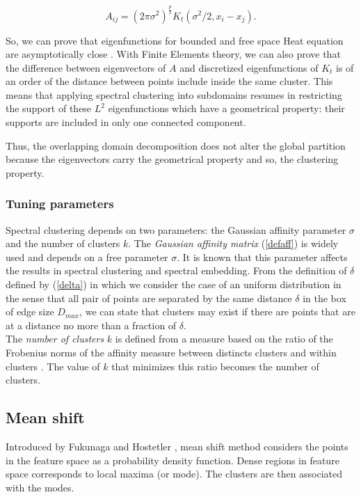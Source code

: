 \documentclass{llncs}
\begin{document}
\begin{equation}
  A_{ij}=(2\pi \sigma^2)^{\frac{p}{2}} K_t\left({\sigma^2}/{2},x_i-x_j\right). \label{lien}
\end{equation}

So, we can prove that eigenfunctions for bounded and free space Heat equation
are asymptotically close \cite{mouysset2,mouysset2014spectral}. With Finite
Elements theory, we can also prove that the difference between eigenvectors of
$A$ and discretized eigenfunctions of $K_t$ is of an order of the distance
between points include inside the same cluster. This means that applying
spectral clustering into subdomains resumes in restricting the support of
these $L^2$ eigenfunctions which have a geometrical property: their supports
are included in only one connected component.

Thus, the overlapping domain decomposition does not alter the
global partition because the eigenvectors carry the geometrical property and
so, the clustering property.

\subsubsection{Tuning parameters}

Spectral clustering depends on two parameters: the Gaussian affinity parameter
$\sigma$ and the number of clusters $k$.  The \textit{Gaussian affinity
matrix} (\ref{defaff}) is widely used and depends on a free parameter
$\sigma$. It is known that this parameter affects the results in spectral
clustering and spectral embedding.  From the definition of $\delta$ defined by
(\ref{delta}) in which we consider the case of an uniform distribution in the
sense that all pair of points are separated by the same distance $\delta$ in
the box of edge size $D_{max}$,  we can state that clusters may exist if there
are points that are at a distance no more than a fraction of $\delta$. \\
\noindent The \textit{number of clusters} $k$  is defined from a measure based
on the ratio of the Frobenius norms of the affinity measure between distincts
clusters and within clusters \cite{mouysset3}. The value of $k$ that minimizes
this ratio becomes the number of clusters.


\subsection{Mean shift}

Introduced by Fukunaga and Hostetler \cite{Fukunaga}, mean shift method considers the
points in the feature space as a probability density function. Dense regions
in feature space corresponds to local maxima (or mode). The clusters are then
associated with the modes.
\end{document}
